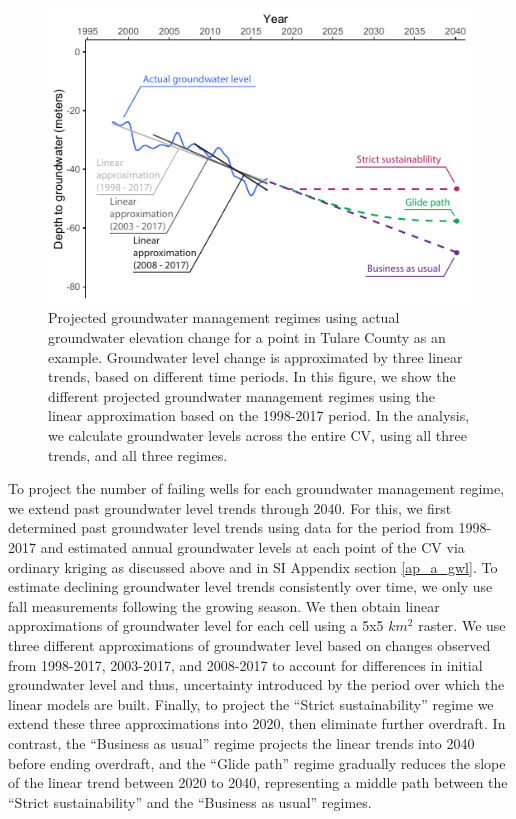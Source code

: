 \begin{figure}%
	\centering
	\includegraphics[width=\textwidth]{ch2_figs/fig_sgma.pdf}
	\caption{Projected groundwater management regimes using actual groundwater elevation change for a point in Tulare County as an example. Groundwater level change is approximated by three linear trends, based on different time periods. In this figure, we show the different projected groundwater management regimes using the linear approximation based on the 1998-2017 period. In the analysis, we calculate groundwater levels across the entire CV, using all three trends, and all three regimes.}
	\label{fig:SGMAscenarios}
\end{figure}

To project the number of failing wells for each groundwater management regime, we extend past groundwater level trends through 2040. For this, we first determined past groundwater level trends using data for the period from 1998-2017 and estimated annual groundwater levels at each point of the CV via ordinary kriging as discussed above and in SI Appendix section \ref{ap_a_gwl}. To estimate declining groundwater level trends consistently over time, we only use fall measurements following the growing season. We then obtain linear approximations of groundwater level for each cell using a 5x5 $km^2$ raster. We use three different approximations of groundwater level based on changes observed from 1998-2017, 2003-2017, and 2008-2017 to account for differences in initial groundwater level and thus, uncertainty introduced by the period over which the linear models are built. Finally, to project the ``Strict sustainability'' regime we extend these three approximations into 2020, then eliminate further overdraft. In contrast, the ``Business as usual'' regime projects the linear trends into 2040 before ending overdraft, and the ``Glide path'' regime gradually reduces the slope of the linear trend between 2020 to 2040, representing a middle path between the ``Strict sustainability'' and the ``Business as usual'' regimes. 




